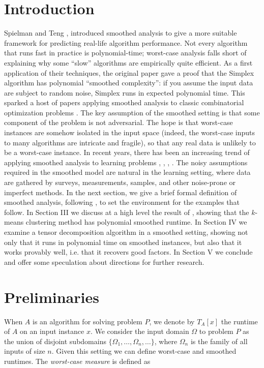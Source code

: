 \documentclass[11pt]{article}
\theoremstyle{definition}
\begin{document}
\section{Introduction}
Spielman and Teng \cite{SA}, \cite{SAtwo} introduced smoothed analysis
to give a more suitable framework for predicting real-life algorithm
performance. Not every algorithm that runs fast in practice is
polynomial-time; worst-case analysis falls short of explaining why
some ``slow'' algorithms are empirically quite efficient. As a first
application of their techniques, the original paper \cite{SA} gave a
proof that the Simplex algorithm has polynomial ``smoothed
complexity'': if you assume the input data are subject to random
noise, Simplex runs in expected polynomial time. This sparked a host
of papers applying smoothed analysis to classic combinatorial
optimization problems \cite{SAtwo}. The key assumption of the smoothed
setting is that some component of the problem is not adversarial. The
hope is that worst-case instances are somehow isolated in the input
space (indeed, the worst-case inputs to many algorithms are intricate
and fragile), so that any real data is unlikely to be a worst-case
instance. In recent years, there has been an increasing trend of
applying smoothed analysis to learning problems \cite{SAtwo},
\cite{SAkmeans}, \cite{PAC}, \cite{TD}. The noisy assumptions required in the smoothed model are natural in the learning setting, where data are gathered by surveys, measurements, samples, and other noise-prone or imperfect methods. In the next section, we give a brief formal definition of smoothed analysis, following
\cite{SAtwo}, to set the environment for the examples that follow. In
Section III we discuss at a high level the result of \cite{SAkmeans},
showing that the $k$-means clustering method has polynomial smoothed runtime. In
Section IV we examine a tensor decomposition algorithm in a smoothed
setting, showing not only that it runs in polynomial time on
smoothed instances, but also that it works provably well, i.e. that it
recovers good factors. In Section V we conclude and offer some
speculation about directions for further research.

\section{Preliminaries}
When $A$ is an algorithm for solving problem $P$, we denote by
$T_A[x]$ the runtime of $A$ on an input instance $x$. We consider the
input domain $\Omega$ to problem $P$ as the union of disjoint
subdomains $\{\Omega_1,\ldots, \Omega_n,\ldots\}$, where $\Omega_n$ is
the family of all inputs of size $n$. Given this setting we can define
worst-case and smoothed runtimes. The \emph{worst-case measure} is defined as
\end{document}
